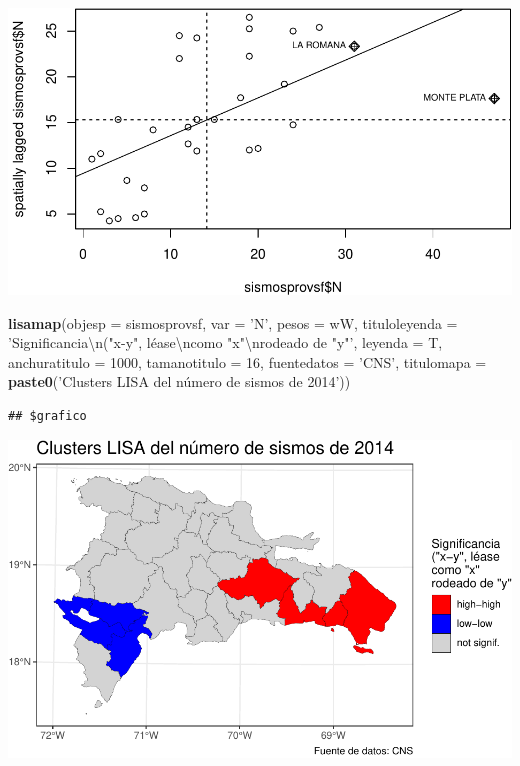 \documentclass[11pt,]{article}
\newenvironment{Shaded}{\begin{snugshade}}{\end{snugshade}}
\newcommand{\KeywordTok}[1]{\textcolor[rgb]{0.13,0.29,0.53}{\textbf{#1}}}
\newcommand{\DataTypeTok}[1]{\textcolor[rgb]{0.13,0.29,0.53}{#1}}
\newcommand{\DecValTok}[1]{\textcolor[rgb]{0.00,0.00,0.81}{#1}}
\newcommand{\CharTok}[1]{\textcolor[rgb]{0.31,0.60,0.02}{#1}}
\newcommand{\StringTok}[1]{\textcolor[rgb]{0.31,0.60,0.02}{#1}}
\newcommand{\OperatorTok}[1]{\textcolor[rgb]{0.81,0.36,0.00}{\textbf{#1}}}
\newcommand{\NormalTok}[1]{#1}
\begin{document}
\begin{Shaded}
\end{Shaded}

\includegraphics{proyecto_files/figure-latex/unnamed-chunk-15-1.pdf}

\begin{Shaded}
\begin{Highlighting}[]
\KeywordTok{lisamap}\NormalTok{(}\DataTypeTok{objesp =}\NormalTok{  sismosprovsf,}
        \DataTypeTok{var =} \StringTok{'N'}\NormalTok{,}
        \DataTypeTok{pesos =}\NormalTok{ wW,}
        \DataTypeTok{tituloleyenda =} \StringTok{'Significancia}\CharTok{\textbackslash{}n}\StringTok{("x-y", léase}\CharTok{\textbackslash{}n}\StringTok{como "x"}\CharTok{\textbackslash{}n}\StringTok{rodeado de "y"'}\NormalTok{,}
        \DataTypeTok{leyenda =}\NormalTok{ T,}
        \DataTypeTok{anchuratitulo =} \DecValTok{1000}\NormalTok{,}
        \DataTypeTok{tamanotitulo =} \DecValTok{16}\NormalTok{,}
        \DataTypeTok{fuentedatos =} \StringTok{'CNS'}\NormalTok{,}
        \DataTypeTok{titulomapa =} \KeywordTok{paste0}\NormalTok{(}\StringTok{'Clusters LISA del número de sismos de 2014'}\NormalTok{))}
\end{Highlighting}
\end{Shaded}

\begin{verbatim}
## $grafico
\end{verbatim}

\includegraphics{proyecto_files/figure-latex/unnamed-chunk-15-2.pdf}
\end{document}
